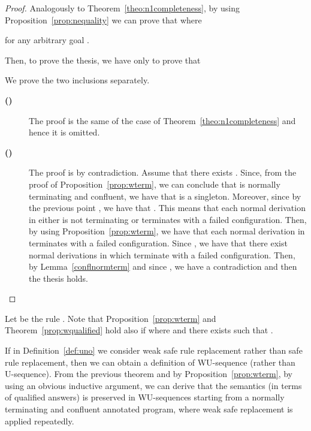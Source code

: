 \documentclass{tlp}
\begin{document}
\begin{proof}
Analogously to Theorem~\ref{theo:n1completeness}, by using Proposition~\ref{prop:nequality}  we can prove that
 where
 
for any arbitrary goal .

Then, to prove the thesis, we have only to prove that

We prove the two inclusions separately.
\begin{description}
  \item[{\bf () }]
  The proof is the same of the case  of Theorem~\ref{theo:n1completeness} and hence it is omitted.


  \item[{\bf () }]
  The proof is by contradiction. Assume that there exists . Since, from the proof of Proposition~\ref{prop:wterm}, we can conclude that  is normally terminating and confluent, we have that  is a singleton. Moreover, since by the previous point
  , we have that .
  This means that each normal derivation in  either is not terminating or terminates with a failed configuration. Then, by using Proposition~\ref{prop:wterm}, we have that each normal derivation in  terminates with a failed configuration. Since , we have that there exist normal derivations in  which terminate with a failed configuration. Then, by Lemma~\ref{conflnormterm} and since , we have a contradiction and then the thesis holds.
\end{description}
\end{proof}

Let  be the rule .
Note that Proposition~\ref{prop:wterm} and Theorem~\ref{prop:wqualified} hold also if 
 where   and there exists
  such that  .



If in Definition~\ref{def:uno} we consider weak safe rule replacement rather than safe rule replacement, then we can obtain a definition
of  WU-sequence (rather than U-sequence).
From the previous theorem and by Proposition~\ref{prop:wterm}, by using an obvious inductive argument, we can derive that the semantics (in terms of qualified
answers) is preserved in WU-sequences starting from a normally terminating and confluent annotated program,
where weak safe replacement is applied repeatedly.
\end{document}
